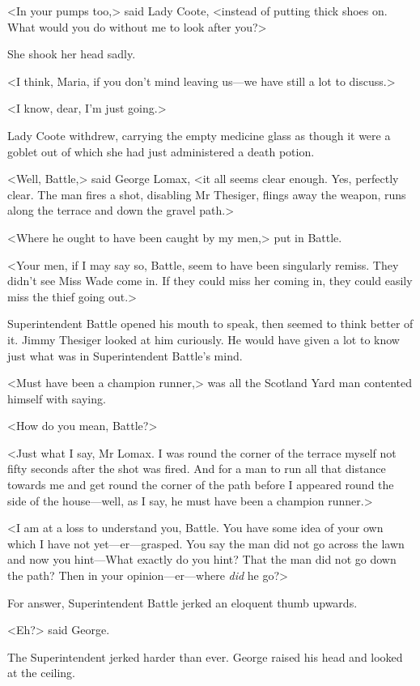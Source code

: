 <In your pumps too,> said Lady Coote, <instead of putting thick shoes on. What would you do without me to look after you?>

She shook her head sadly.

<I think, Maria, if you don't mind leaving us—we have still a lot to discuss.>

<I know, dear, I'm just going.>

Lady Coote withdrew, carrying the empty medicine glass as though it were a goblet out of which she had just administered a death potion.

<Well, Battle,> said George Lomax, <it all seems clear enough. Yes, perfectly clear. The man fires a shot, disabling Mr Thesiger, flings away the weapon, runs along the terrace and down the gravel path.>

<Where he ought to have been caught by my men,> put in Battle.

<Your men, if I may say so, Battle, seem to have been singularly remiss. They didn't see Miss Wade come in. If they could miss her coming in, they could easily miss the thief going out.>

Superintendent Battle opened his mouth to speak, then seemed to think better of it. Jimmy Thesiger looked at him curiously. He would have given a lot to know just what was in Superintendent Battle's mind.

<Must have been a champion runner,> was all the Scotland Yard man contented himself with saying.

<How do you mean, Battle?>

<Just what I say, Mr Lomax. I was round the corner of the terrace myself not fifty seconds after the shot was fired. And for a man to run all that distance towards me and get round the corner of the path before I appeared round the side of the house—well, as I say, he must have been a champion runner.>

<I am at a loss to understand you, Battle. You have some idea of your own which I have not yet—er—grasped. You say the man did not go across the lawn and now you hint—What exactly do you hint? That the man did not go down the path? Then in your opinion—er—where \emph{did} he go?>

For answer, Superintendent Battle jerked an eloquent thumb upwards.

<Eh?> said George.

The Superintendent jerked harder than ever. George raised his head and looked at the ceiling.

